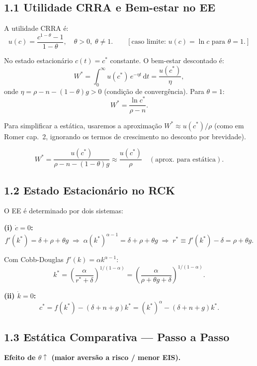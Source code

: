 \documentclass[12pt, a4paper]{article}
\newcommand{\dif}{\mathrm{d}}
\begin{document}
\subsection*{1.1 Utilidade CRRA e Bem-estar no EE}

A utilidade CRRA é:
\[
u(c) = \frac{c^{1-\theta}-1}{1-\theta}, \quad \theta > 0,\; \theta \neq 1. \qquad [\text{caso limite: } u(c) = \ln c \text{ para } \theta = 1.]
\]

No estado estacionário $c(t) = c^*$ constante. O bem-estar descontado é:
\[
W^* = \int_0^\infty u(c^*)\,e^{-\eta t}\,\dif t = \frac{u(c^*)}{\eta},
\]
onde $\eta = \rho - n - (1-\theta)g > 0$ (condição de convergência). Para $\theta=1$:
\[
W^* = \frac{\ln c^*}{\rho - n}.
\]

Para simplificar a estática, usaremos a aproximação $W^* \approx u(c^*)/\rho$ (como em Romer cap.\ 2, ignorando os termos de crescimento no desconto por brevidade).

\begin{resultbox}[title={Bem-estar no Estado Estacionário (RCK)}]
\[
W^* = \frac{u(c^*)}{\rho - n - (1-\theta)g} \approx \frac{u(c^*)}{\rho} \quad (\text{aprox. para estática}).
\]
\end{resultbox}

\subsection*{1.2 Estado Estacionário no RCK}

O EE é determinado por dois sistemas:

\textbf{(i) $\dot{c} = 0$:}
\[
f'(k^*) = \delta + \rho + \theta g \;\Longrightarrow\; \alpha(k^*)^{\alpha-1} = \delta + \rho + \theta g \;\Longrightarrow\; r^* \equiv f'(k^*)-\delta = \rho + \theta g.
\]

Com Cobb-Douglas $f'(k) = \alpha k^{\alpha-1}$:
\[
k^* = \left(\frac{\alpha}{r^* + \delta}\right)^{1/(1-\alpha)} = \left(\frac{\alpha}{\rho+\theta g+\delta}\right)^{1/(1-\alpha)}.
\]

\textbf{(ii) $\dot{k} = 0$:}
\[
c^* = f(k^*) - (\delta + n + g)k^* = (k^*)^\alpha - (\delta+n+g)k^*.
\]

\subsection*{1.3 Estática Comparativa --- Passo a Passo}

\textbf{Efeito de $\theta\uparrow$ (maior aversão a risco / menor EIS).}
\end{document}
